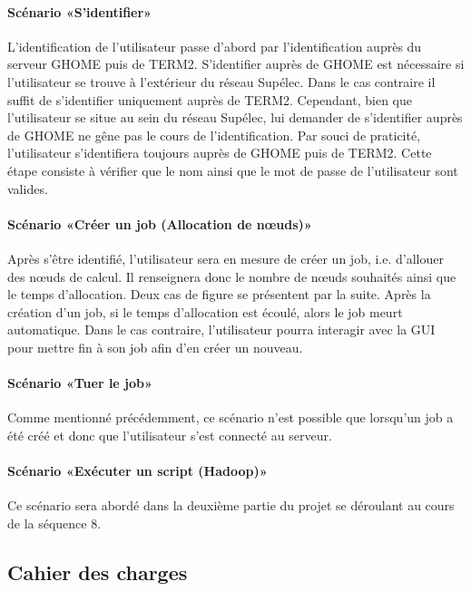 \paragraph{Scénario «S’identifier»}
L’identification de l’utilisateur passe d’abord par l’identification auprès du serveur GHOME puis de TERM2. S’identifier auprès de GHOME est nécessaire si l’utilisateur se trouve à l’extérieur du réseau Supélec. Dans le cas contraire il suffit de s’identifier uniquement auprès de TERM2. Cependant, bien que l’utilisateur se situe au sein du réseau Supélec, lui demander de s’identifier auprès de GHOME ne gêne pas le cours de l’identification. Par souci de praticité, l’utilisateur s’identifiera toujours auprès de GHOME puis de TERM2.
Cette étape consiste à vérifier que le nom ainsi que le mot de passe de l’utilisateur sont valides.

\paragraph{Scénario «Créer un job (Allocation de nœuds)»}
\label{sec:scenario-creer-un}
Après s’être identifié, l’utilisateur sera en mesure de créer un job, i.e. d’allouer des nœuds de calcul. Il renseignera donc le nombre de nœuds souhaités ainsi que le temps d’allocation. Deux cas de figure se présentent par la suite.
Après la création d’un job, si le temps d’allocation est écoulé, alors le job meurt automatique. Dans le cas contraire, l’utilisateur pourra interagir avec la GUI pour mettre fin à son job afin d’en créer un nouveau.

\paragraph{Scénario «Tuer le job»}
\label{sec:scenario-tuer-le}
Comme mentionné précédemment, ce scénario n’est possible que lorsqu’un job a été créé et donc que l’utilisateur s’est connecté au serveur. 

\paragraph{Scénario «Exécuter un script (Hadoop)»}
\label{sec:scenario-executer-un}
Ce scénario sera abordé dans la deuxième partie du projet se déroulant au cours de la séquence 8.


\subsection{Cahier des charges}
\label{sec:cahier-des-charges}

